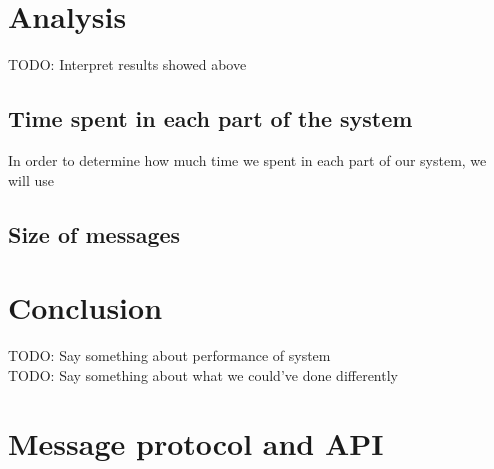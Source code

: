 \documentclass{article}
\begin{document}
    \section{Analysis}
        TODO: Interpret results showed above

        \subsection{Time spent in each part of the system}
            In order to determine how much time we spent in each part of our system, we will use


        \subsection{Size of messages}

    \section{Conclusion}
        TODO: Say something about performance of system\\
        TODO: Say something about what we could've done differently
    \clearpage
    \appendix
        \section{Message protocol and API}
        \label{sec:message_protocol_api}
\end{document}
